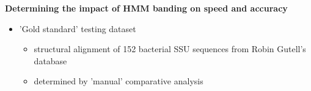 \documentclass[landscape]{slides}
\begin{document}
\begin{slide}
\begin{center}

\textbf{Determining the impact of HMM banding on speed and accuracy}
\end{center}
\medskip

\small
\begin{itemize}
\item
'Gold standard' testing dataset
\begin{itemize}
\item
structural alignment of 152 bacterial SSU sequences
from Robin Gutell's database
\item
determined by 'manual' comparative analysis

\end{itemize}
\end{itemize}


\vfill
\end{slide}
\end{document}
